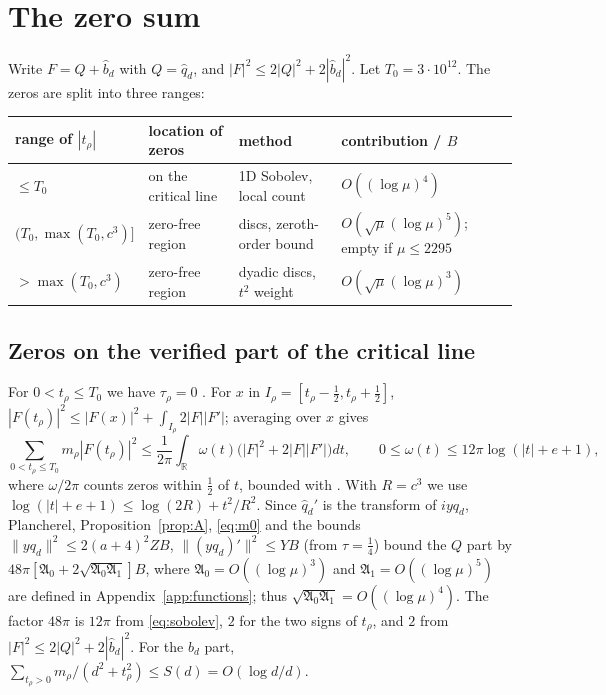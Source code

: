 \documentclass[11pt]{amsart}
\theoremstyle{remark}
\numberwithin{equation}{section}
\newcommand{\R}{\mathbb{R}}
\begin{document}
\section{The zero sum}\label{sec:zeros}

Write $F=Q+\hat b_d$ with $Q=\hat q_d$, and $|F|^2\le2|Q|^2+2|\hat b_d|^2$. Let $T_0=3\cdot10^{12}$. The zeros are split into three ranges:

\begin{table}[h]
\centering\small
\begin{tabular}{llll}
\toprule
range of $|t_\rho|$ & location of zeros & method & contribution / $B$\\
\midrule
$\le T_0$ & on the critical line \cite{PT21} & 1D Sobolev, local count & $O((\log\mu)^4)$\\
$(T_0,\max(T_0,c^3)]$ & zero-free region \cite{MT15} & discs, zeroth-order bound & $O(\sqrt\mu(\log\mu)^5)$; empty if $\mu\le2295$\\
$>\max(T_0,c^3)$ & zero-free region \cite{MT15} & dyadic discs, $t^2$ weight & $O(\sqrt\mu(\log\mu)^3)$\\
\bottomrule
\end{tabular}
\end{table}

\subsection{Zeros on the verified part of the critical line}
For $0<t_\rho\le T_0$ we have $\tau_\rho=0$ \cite{PT21}. For $x$ in $I_\rho=[t_\rho-\frac12,t_\rho+\frac12]$, $|F(t_\rho)|^2\le|F(x)|^2+\int_{I_\rho}2|F||F'|$; averaging over $x$ gives
\begin{equation}\label{eq:sobolev}
\sum_{0<t_\rho\le T_0}m_\rho|F(t_\rho)|^2\le\frac1{2\pi}\int_\R\omega(t)\bigl(|F|^2+2|F||F'|\bigr)dt,\qquad0\le\omega(t)\le12\pi\log(|t|+e+1),
\end{equation}
where $\omega/2\pi$ counts zeros within $\frac12$ of $t$, bounded with \cite{Trudgian14}. With $R=c^3$ we use $\log(|t|+e+1)\le\log(2R)+t^2/R^2$. Since $\hat q_d'$ is the transform of $iyq_d$, Plancherel, Proposition~\ref{prop:A}, \eqref{eq:m0} and the bounds $\|yq_d\|^2\le2(a+4)^2ZB$, $\|(yq_d)'\|^2\le YB$ (from $\tau=\frac14$) bound the $Q$ part by $48\pi[\mathfrak A_0+2\sqrt{\mathfrak A_0\mathfrak A_1}]B$, where $\mathfrak A_0=O((\log\mu)^3)$ and $\mathfrak A_1=O((\log\mu)^5)$ are defined in Appendix~\ref{app:functions}; thus $\sqrt{\mathfrak A_0\mathfrak A_1}=O((\log\mu)^4)$. The factor $48\pi$ is $12\pi$ from \eqref{eq:sobolev}, $2$ for the two signs of $t_\rho$, and $2$ from $|F|^2\le2|Q|^2+2|\hat b_d|^2$. For the $b_d$ part, $\sum_{t_\rho>0}m_\rho/(d^2+t_\rho^2)\le S(d)=O(\log d/d)$.
\end{document}
